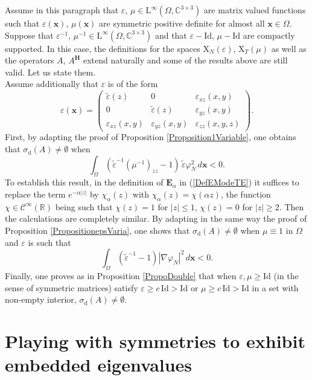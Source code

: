 \documentclass[11pt,a4paper]{article}
\newcommand{\dsp}{\displaystyle}
\newcommand{\eps}{\varepsilon}
\newcommand{\Om}{\Omega}
\newcommand{\mrm}[1]{\mathrm{#1}}
\newcommand{\bfx}{\boldsymbol{x}}
\newcommand{\Cplx}{\mathbb{C}}
\newcommand{\R}{\mathbb{R}}
\newcommand{\mL}{\mrm{L}}
\newcommand{\mX}{\mrm{X}}
\def\E{\boldsymbol{E}}
\def\H{\boldsymbol{H}}
\begin{document}
Assume in this paragraph that $\eps$, $\mu\in \mL^{\infty}(\Om,\Cplx^{3\times 3})$ are matrix valued functions such that $\eps(\bfx)$, $\mu(\bfx)$ are symmetric positive definite for almost all $\bfx\in\Om$. Suppose that $\eps^{-1}$, $\mu^{-1}\in \mL^{\infty}(\Om,\Cplx^{3\times 3})$ and that $\eps-\mrm{Id}$, $\mu-\mrm{Id}$ are compactly supported. In this case, the definitions for the spaces $\boldsymbol{\mX}_N(\eps)$, $\boldsymbol{\mX}_T(\mu)$ as well as the operators $A$, $A^{\H}$ extend naturally and some of the results above are still valid. Let us state them.\\
\newline
Assume additionally that $\eps$ is of the form 
\[
\eps(\bfx)=\left(\begin{array}{ccc}
\tilde{\eps}(z) & 0 & \eps_{xz}(x,y)\\
0 & \tilde{\eps}(z) & \eps_{yz}(x,y)\\
\eps_{xz}(x,y) &  \eps_{yz}(x,y) & \eps_{zz}(x,y,z)
\end{array}\right).
\] 
First, by adapting the proof of Proposition \ref{Proposition1Variable}, one obtains that $\sigma_{\mrm{d}}(A)\ne\emptyset$ when 
\[
\int_{\Om}(\tilde{\eps}^{-1}(\mu^{-1})_{zz}-1)\,\tilde{\eps}\varphi_N^2\,d\bfx<0.
\]
To establish this result, in the definition of $\E_\alpha$ in (\ref{DefEModeTE}) it suffices to replace the term $e^{-\alpha |z|}$ by $\chi_\alpha(z)$ with $\chi_\alpha(z)=\chi(\alpha z)$, the function $\chi\in\mathscr{C}^{\infty}(\R)$ being such that $\chi(z)=1$ for $|z|\le 1$, $\chi(z)=0$ for $|z|\ge 2$. Then the 
calculations are completely similar. By adapting in the same way the proof of Proposition \ref{PropositionepsVaria}, one shows that $\sigma_{\mrm{d}}(A)\ne\emptyset$ when $\mu\equiv1$ in $\Om$ and $\eps$ is such that
\[
\dsp\int_\Om (\tilde{\eps}^{-1}-1)|\nabla\varphi_N|^2\,d\bfx<0.
\]
Finally, one proves as in Proposition \ref{PropoDouble} that when $\eps,\mu\ge \mrm{Id}$ (in the sense of symmetric matrices) satisfy $\eps\ge c\,\mrm{Id}>\mrm{Id}$ or $\mu\ge c\,\mrm{Id}>\mrm{Id}$ in a set with non-empty interior, $\sigma_{\mrm{d}}(A)\ne\emptyset$.  

\section{Playing with symmetries to exhibit embedded eigenvalues}\label{SectionSym}
\end{document}
